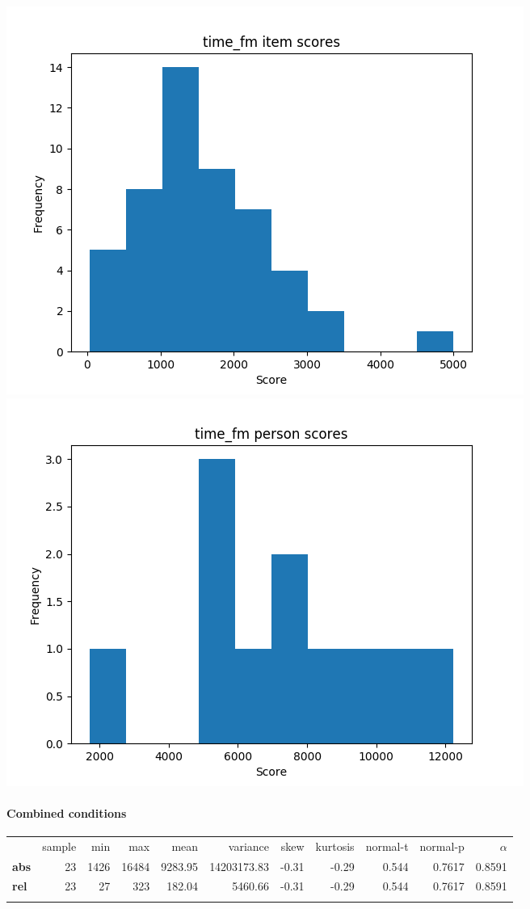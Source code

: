\documentclass[]{article}
\begin{document}
\includegraphics{time_fm_diff.png} \includegraphics{time_fm_abil.png}

\FloatBarrier
\paragraph{Combined conditions}\label{combined-conditions-2}

\begin{longtable}[c]{@{}lrrrrrrrrrr@{}}
\toprule\addlinespace
& sample & min & max & mean & variance & skew & kurtosis & normal-t &
normal-p & $\alpha$
\\\addlinespace
\midrule\endhead
\textbf{abs} & 23 & 1426 & 16484 & 9283.95 & 14203173.83 & -0.31 & -0.29
& 0.544 & 0.7617 & 0.8591
\\\addlinespace
\textbf{rel} & 23 & 27 & 323 & 182.04 & 5460.66 & -0.31 & -0.29 & 0.544
& 0.7617 & 0.8591
\\\addlinespace
\bottomrule
\end{longtable}
\end{document}
